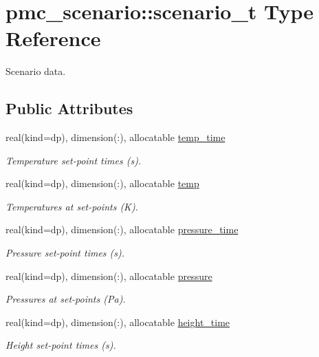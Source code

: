 \hypertarget{structpmc__scenario_1_1scenario__t}{}\section{pmc\+\_\+scenario\+:\+:scenario\+\_\+t Type Reference}
\label{structpmc__scenario_1_1scenario__t}


Scenario data.  


\subsection*{Public Attributes}
\begin{DoxyCompactItemize}
\item 
real(kind=dp), dimension(\+:), allocatable \mbox{\hyperlink{structpmc__scenario_1_1scenario__t_aa25d76136ee1927867d84a22dfd0ae80}{temp\+\_\+time}}
\begin{DoxyCompactList}\small\item\em Temperature set-\/point times (s). \end{DoxyCompactList}\item 
real(kind=dp), dimension(\+:), allocatable \mbox{\hyperlink{structpmc__scenario_1_1scenario__t_a24e15d681947f9d0096293df5e67bbb8}{temp}}
\begin{DoxyCompactList}\small\item\em Temperatures at set-\/points (K). \end{DoxyCompactList}\item 
real(kind=dp), dimension(\+:), allocatable \mbox{\hyperlink{structpmc__scenario_1_1scenario__t_a5b4310114f4861343c494c7e218075e3}{pressure\+\_\+time}}
\begin{DoxyCompactList}\small\item\em Pressure set-\/point times (s). \end{DoxyCompactList}\item 
real(kind=dp), dimension(\+:), allocatable \mbox{\hyperlink{structpmc__scenario_1_1scenario__t_a6cff527ba8a1ba3603421f0e779a5edd}{pressure}}
\begin{DoxyCompactList}\small\item\em Pressures at set-\/points (Pa). \end{DoxyCompactList}\item 
real(kind=dp), dimension(\+:), allocatable \mbox{\hyperlink{structpmc__scenario_1_1scenario__t_a8d7a587f6e1f44ff022b858240114140}{height\+\_\+time}}
\begin{DoxyCompactList}\small\item\em Height set-\/point times (s). \end{DoxyCompactList}\item 

\end{DoxyCompactItemize}
